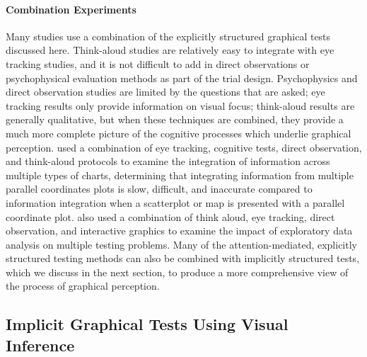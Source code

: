 \documentclass[letterpaper]{ar-1col}\usepackage[]{graphicx}\usepackage[]{color}
\begin{document}
\paragraph{Combination Experiments}
Many studies use a combination of the explicitly structured graphical tests discussed here. Think-aloud studies are relatively easy to integrate with eye tracking studies, and it is not difficult to add in direct observations or psychophysical evaluation methods as part of the trial design. Psychophysics and direct observation studies are limited by the questions that are asked; eye tracking results only provide information on visual focus; think-aloud results are generally qualitative, but when these techniques are combined, they provide a much more complete picture of the cognitive processes which underlie graphical perception. \citet{ryuExploringCognitiveStrategies2003} used a combination of eye tracking, cognitive tests, direct observation, and think-aloud protocols to examine the integration of information across multiple types of charts, determining that integrating information from multiple parallel coordinates plots is slow, difficult, and inaccurate compared to information integration when a scatterplot or map is presented with a parallel coordinate plot. \citet{zgraggenInvestigatingEffectMultiple2018} also used a combination of think aloud, eye tracking, direct observation, and interactive graphics to examine the impact of exploratory data analysis on multiple testing problems. Many of the attention-mediated, explicitly structured testing methods can also be combined with implicitly structured tests, which we discuss in the next section, to produce a more comprehensive view of the process of graphical perception.



\subsection{Implicit Graphical Tests Using Visual Inference} %
\end{document}
